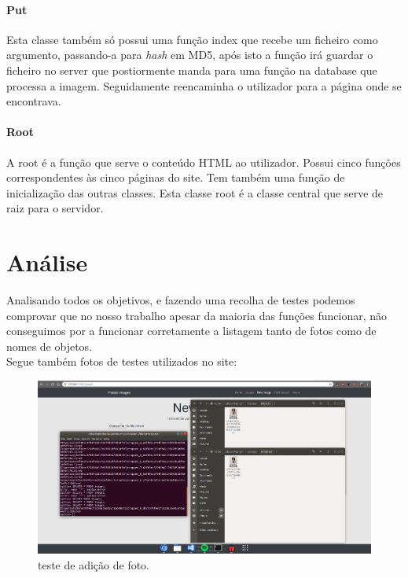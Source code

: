 \documentclass{report}
\begin{document}
\subsubsection{Put}
Esta classe também só possui uma função index que recebe um ficheiro como argumento, passando-a para \textit{hash} em MD5, após isto a função irá guardar o ficheiro no server que postiormente manda para uma função na database que processa a imagem. Seguidamente reencaminha o utilizador para a página onde se encontrava.
\subsubsection{Root}
A root é a função que serve o conteúdo HTML ao utilizador. Possui cinco funções correspondentes às cinco páginas do site. Tem também uma função de inicialização das outras classes. Esta classe root é a classe central que serve de raiz para o servidor.


\chapter{Análise}
\label{chap.analise}
Analisando todos os objetivos, e fazendo uma recolha de testes podemos comprovar que no nosso trabalho apesar da maioria das funções funcionar, não conseguimos por a funcionar corretamente a listagem tanto de fotos como de nomes de objetos.\\
Segue também fotos de testes utilizados no site:

\begin{figure}
  \includegraphics[width=\linewidth]{teste1.png}
  \caption{teste de adição de foto.}
  \label{teste de adição de foto}
\end{figure}
\end{document}
